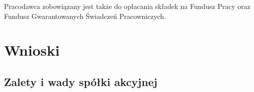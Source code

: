 \documentclass[a4paper, 11pt]{article}
\begin{document}
Pracodawca zobowiązany jest także do opłacania składek na Fundusz Pracy oraz Fundusz Gwarantowanych Świadczeń Pracowniczych.

\section{Wnioski}
 
\subsection{Zalety i wady spółki akcyjnej}
\indent
\end{document}
